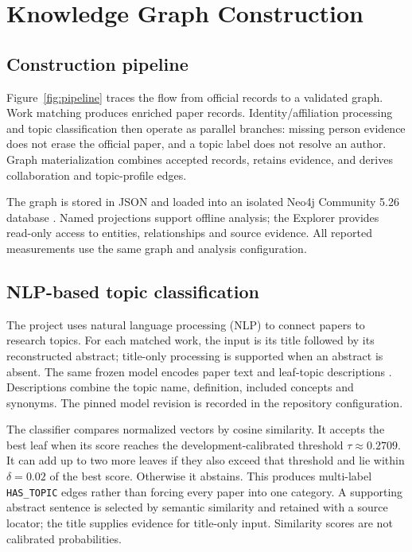\chapter{Knowledge Graph Construction}
\label{ch:graph}
\section{Construction pipeline}
Figure~\ref{fig:pipeline} traces the flow from official records to a validated
graph. Work matching produces enriched paper records. Identity/affiliation
processing and topic classification then operate as parallel branches: missing
person evidence does not erase the official paper, and a topic label does not
resolve an author. Graph materialization combines accepted records, retains
evidence, and derives collaboration and topic-profile edges.



The graph is stored in JSON and loaded into an
isolated Neo4j Community 5.26 database \citep{neo4jDocs}. Named
projections support offline analysis; the Explorer provides read-only access to
entities, relationships and source evidence. All reported measurements use
the same graph and analysis configuration.

\section{NLP-based topic classification}
The project uses natural language processing (NLP) to connect papers to research topics. For each matched
work, the input is its title followed by its reconstructed abstract; title-only
processing is supported when an abstract is absent. The same frozen
 model encodes paper text and
leaf-topic descriptions \citep{reimers2019sentencebert,minilmModelCard}.
Descriptions combine the topic name, definition, included concepts and synonyms.
The pinned model revision is recorded in the repository configuration.

The classifier compares normalized vectors by cosine similarity. It accepts
the best leaf when its score reaches the development-calibrated threshold
$\tau\approx0.2709$. It can add up to two more leaves if they also exceed that
threshold and lie within $\delta=0.02$ of the best score. Otherwise it abstains.
This produces multi-label \texttt{HAS\_TOPIC} edges rather than forcing every
paper into one category. A supporting abstract sentence is selected by semantic
similarity and retained with a source locator; the title supplies evidence for
title-only input. Similarity scores are not calibrated probabilities.

